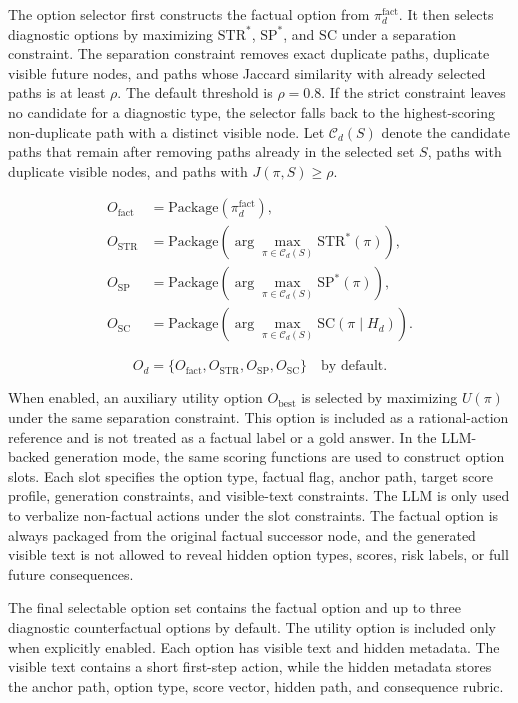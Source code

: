 \documentclass[pdflatex,sn-mathphys-num]{sn-jnl}%
\theoremstyle{thmstyleone}%
\theoremstyle{thmstyletwo}%
\theoremstyle{thmstylethree}%
\begin{document}
The option selector first constructs the factual option from $\pi_d^{\mathrm{fact}}$. It then selects diagnostic options by maximizing $\mathrm{STR}^{*}$, $\mathrm{SP}^{*}$, and $\mathrm{SC}$ under a separation constraint. The separation constraint removes exact duplicate paths, duplicate visible future nodes, and paths whose Jaccard similarity with already selected paths is at least $\rho$. The default threshold is $\rho=0.8$. If the strict constraint leaves no candidate for a diagnostic type, the selector falls back to the highest-scoring non-duplicate path with a distinct visible node. Let $\mathcal{C}_d(S)$ denote the candidate paths that remain after removing paths already in the selected set $S$, paths with duplicate visible nodes, and paths with $J(\pi,S)\ge \rho$.

\begin{align}
O_{\mathrm{fact}}&=\mathrm{Package}(\pi_d^{\mathrm{fact}}),\\
O_{\mathrm{STR}}&=\mathrm{Package}\!\left(\arg\max_{\pi\in\mathcal{C}_d(S)}\mathrm{STR}^{*}(\pi)\right),\\
O_{\mathrm{SP}}&=\mathrm{Package}\!\left(\arg\max_{\pi\in\mathcal{C}_d(S)}\mathrm{SP}^{*}(\pi)\right),\\
O_{\mathrm{SC}}&=\mathrm{Package}\!\left(\arg\max_{\pi\in\mathcal{C}_d(S)}\mathrm{SC}(\pi\mid H_d)\right).
\end{align}


\begin{equation}
O_d=\{O_{\mathrm{fact}},O_{\mathrm{STR}},O_{\mathrm{SP}},O_{\mathrm{SC}}\}
\quad\text{by default.}
\end{equation}

When enabled, an auxiliary utility option $O_{\mathrm{best}}$ is selected by maximizing $U(\pi)$ under the same separation constraint. This option is included as a rational-action reference and is not treated as a factual label or a gold answer.
In the LLM-backed generation mode, the same scoring functions are used to construct option slots. Each slot specifies the option type, factual flag, anchor path, target score profile, generation constraints, and visible-text constraints. The LLM is only used to verbalize non-factual actions under the slot constraints. The factual option is always packaged from the original factual successor node, and the generated visible text is not allowed to reveal hidden option types, scores, risk labels, or full future consequences.

The final selectable option set contains the factual option and up to three diagnostic counterfactual options by default. The utility option is included only when explicitly enabled. Each option has visible text and hidden metadata. The visible text contains a short first-step action, while the hidden metadata stores the anchor path, option type, score vector, hidden path, and consequence rubric.
\end{document}
